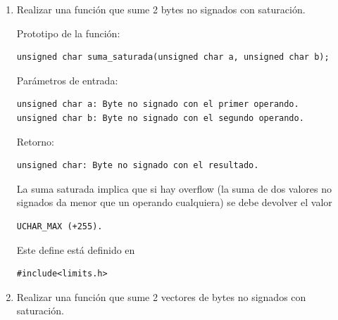 \documentclass[12pt]{article} %
\begin{document}
\begin{enumerate}
 \item Realizar una función que sume 2 bytes no signados con saturación.

Prototipo de la función:
\lstset{language=c,
	numbers=none,
	numberstyle=,
	numbersep=,
}
 \begin{lstlisting}
unsigned char suma_saturada(unsigned char a, unsigned char b);
\end{lstlisting}
Parámetros de entrada:

\lstset{language=c,
	numbers=none,
	numberstyle=,
	numbersep=,
}
 \begin{lstlisting}
unsigned char a: Byte no signado con el primer operando.
unsigned char b: Byte no signado con el segundo operando.
\end{lstlisting}

Retorno:

\lstset{language=c,
	numbers=none,
	numberstyle=,
	numbersep=,
}
 \begin{lstlisting}
unsigned char: Byte no signado con el resultado.
\end{lstlisting}

La suma saturada implica que si hay {\color{blue}overflow} (la suma de dos valores no signados da menor que un operando cualquiera) se debe devolver el valor
\lstset{language=c,
	numbers=none,
	numberstyle=,
	numbersep=,
}
 \begin{lstlisting}
UCHAR_MAX (+255).
\end{lstlisting}

Este define está definido en 
\lstset{language=c,
	numbers=none,
	numberstyle=,
	numbersep=,
}

 \begin{lstlisting}
#include<limits.h>
\end{lstlisting}

\item Realizar una función que sume 2 vectores de bytes no signados con saturación.


\end{enumerate}
\end{document}
